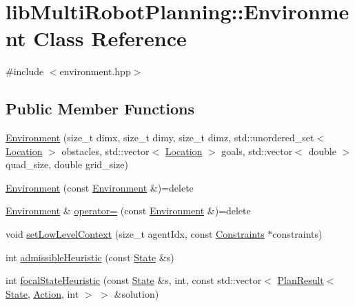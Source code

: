 \hypertarget{classlib_multi_robot_planning_1_1_environment}{}\section{lib\+Multi\+Robot\+Planning\+:\+:Environment Class Reference}
\label{classlib_multi_robot_planning_1_1_environment}


{\ttfamily \#include $<$environment.\+hpp$>$}

\subsection*{Public Member Functions}
\begin{DoxyCompactItemize}
\item 
\hyperlink{classlib_multi_robot_planning_1_1_environment_a9206e2bb7f685366383be977bba38979}{Environment} (size\+\_\+t dimx, size\+\_\+t dimy, size\+\_\+t dimz, std\+::unordered\+\_\+set$<$ \hyperlink{structlib_multi_robot_planning_1_1_location}{Location} $>$ obstacles, std\+::vector$<$ \hyperlink{structlib_multi_robot_planning_1_1_location}{Location} $>$ goals, std\+::vector$<$ double $>$ quad\+\_\+size, double grid\+\_\+size)
\item 
\hyperlink{classlib_multi_robot_planning_1_1_environment_a03a78ae30f71dcd77189ca11756c97d1}{Environment} (const \hyperlink{classlib_multi_robot_planning_1_1_environment}{Environment} \&)=delete
\item 
\hyperlink{classlib_multi_robot_planning_1_1_environment}{Environment} \& \hyperlink{classlib_multi_robot_planning_1_1_environment_afaf6184a779ac88068b4d405080d055c}{operator=} (const \hyperlink{classlib_multi_robot_planning_1_1_environment}{Environment} \&)=delete
\item 
void \hyperlink{classlib_multi_robot_planning_1_1_environment_a7a664e26155157d558e0755204b74d11}{set\+Low\+Level\+Context} (size\+\_\+t agent\+Idx, const \hyperlink{structlib_multi_robot_planning_1_1_constraints}{Constraints} $\ast$constraints)
\item 
int \hyperlink{classlib_multi_robot_planning_1_1_environment_a125ea447e414ab365fea0eead52e47d7}{admissible\+Heuristic} (const \hyperlink{structlib_multi_robot_planning_1_1_state}{State} \&s)
\item 
int \hyperlink{classlib_multi_robot_planning_1_1_environment_ac76b52b63f0bfbdde9dc6fed2520a0b6}{focal\+State\+Heuristic} (const \hyperlink{structlib_multi_robot_planning_1_1_state}{State} \&s, int, const std\+::vector$<$ \hyperlink{structlib_multi_robot_planning_1_1_plan_result}{Plan\+Result}$<$ \hyperlink{structlib_multi_robot_planning_1_1_state}{State}, \hyperlink{namespacelib_multi_robot_planning_aba73fb71693f86a324adfa0e41e1053d}{Action}, int $>$ $>$ \&solution)

\end{DoxyCompactItemize}
